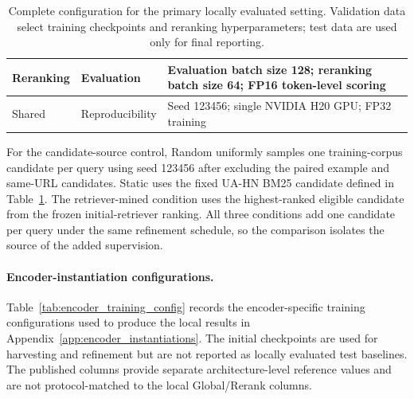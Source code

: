\documentclass[11pt]{article}
\begin{document}
\begin{table}[!t]
\begin{tabular}{p{}p{}p{}}
    Reranking & Evaluation & Evaluation batch size 128; reranking batch size 64; FP16 token-level scoring \\
    \midrule
    Shared & Reproducibility & Seed 123456; single NVIDIA H20 GPU; FP32 training \\
    \bottomrule
  \end{tabular}
  \caption{Complete configuration for the primary locally evaluated setting. Validation data select training checkpoints and reranking hyperparameters; test data are used only for final reporting.}
  \label{tab:primary_configuration}
\end{table}

For the candidate-source control, Random uniformly samples one training-corpus candidate per query using seed 123456 after excluding the paired example and same-URL candidates. Static uses the fixed UA-HN BM25 candidate defined in Table~\ref{tab:primary_configuration}. The retriever-mined condition uses the highest-ranked eligible candidate from the frozen initial-retriever ranking. All three conditions add one candidate per query under the same refinement schedule, so the comparison isolates the source of the added supervision.

\paragraph{Encoder-instantiation configurations.}
Table~\ref{tab:encoder_training_config} records the encoder-specific training configurations used to produce the local results in Appendix~\ref{app:encoder_instantiations}. The initial checkpoints are used for harvesting and refinement but are not reported as locally evaluated test baselines. The published columns provide separate architecture-level reference values and are not protocol-matched to the local Global/Rerank columns.
\end{document}

